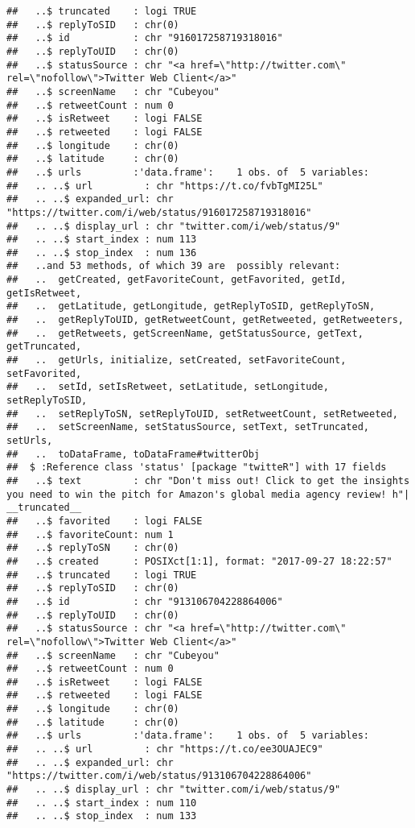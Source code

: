 \documentclass[]{article}
\begin{document}
\begin{verbatim}
##   ..$ truncated    : logi TRUE
##   ..$ replyToSID   : chr(0) 
##   ..$ id           : chr "916017258719318016"
##   ..$ replyToUID   : chr(0) 
##   ..$ statusSource : chr "<a href=\"http://twitter.com\" rel=\"nofollow\">Twitter Web Client</a>"
##   ..$ screenName   : chr "Cubeyou"
##   ..$ retweetCount : num 0
##   ..$ isRetweet    : logi FALSE
##   ..$ retweeted    : logi FALSE
##   ..$ longitude    : chr(0) 
##   ..$ latitude     : chr(0) 
##   ..$ urls         :'data.frame':    1 obs. of  5 variables:
##   .. ..$ url         : chr "https://t.co/fvbTgMI25L"
##   .. ..$ expanded_url: chr "https://twitter.com/i/web/status/916017258719318016"
##   .. ..$ display_url : chr "twitter.com/i/web/status/9"
##   .. ..$ start_index : num 113
##   .. ..$ stop_index  : num 136
##   ..and 53 methods, of which 39 are  possibly relevant:
##   ..  getCreated, getFavoriteCount, getFavorited, getId, getIsRetweet,
##   ..  getLatitude, getLongitude, getReplyToSID, getReplyToSN,
##   ..  getReplyToUID, getRetweetCount, getRetweeted, getRetweeters,
##   ..  getRetweets, getScreenName, getStatusSource, getText, getTruncated,
##   ..  getUrls, initialize, setCreated, setFavoriteCount, setFavorited,
##   ..  setId, setIsRetweet, setLatitude, setLongitude, setReplyToSID,
##   ..  setReplyToSN, setReplyToUID, setRetweetCount, setRetweeted,
##   ..  setScreenName, setStatusSource, setText, setTruncated, setUrls,
##   ..  toDataFrame, toDataFrame#twitterObj
##  $ :Reference class 'status' [package "twitteR"] with 17 fields
##   ..$ text         : chr "Don't miss out! Click to get the insights you need to win the pitch for Amazon's global media agency review! h"| __truncated__
##   ..$ favorited    : logi FALSE
##   ..$ favoriteCount: num 1
##   ..$ replyToSN    : chr(0) 
##   ..$ created      : POSIXct[1:1], format: "2017-09-27 18:22:57"
##   ..$ truncated    : logi TRUE
##   ..$ replyToSID   : chr(0) 
##   ..$ id           : chr "913106704228864006"
##   ..$ replyToUID   : chr(0) 
##   ..$ statusSource : chr "<a href=\"http://twitter.com\" rel=\"nofollow\">Twitter Web Client</a>"
##   ..$ screenName   : chr "Cubeyou"
##   ..$ retweetCount : num 0
##   ..$ isRetweet    : logi FALSE
##   ..$ retweeted    : logi FALSE
##   ..$ longitude    : chr(0) 
##   ..$ latitude     : chr(0) 
##   ..$ urls         :'data.frame':    1 obs. of  5 variables:
##   .. ..$ url         : chr "https://t.co/ee3OUAJEC9"
##   .. ..$ expanded_url: chr "https://twitter.com/i/web/status/913106704228864006"
##   .. ..$ display_url : chr "twitter.com/i/web/status/9"
##   .. ..$ start_index : num 110
##   .. ..$ stop_index  : num 133

\end{verbatim}
\end{document}
